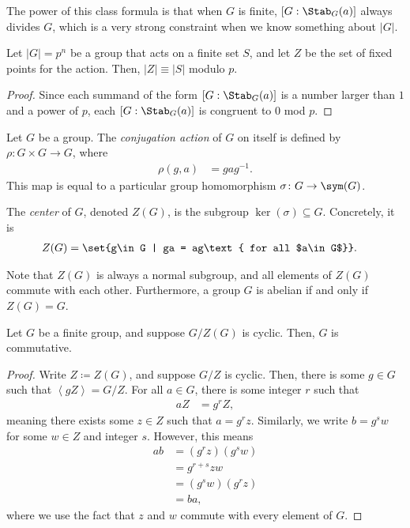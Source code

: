 \documentclass[10pt]{mypackage}
\begin{document}
The power of this class formula is that when $G$ is finite, $\left[ G:\Stab_G(a) \right]$ always divides $G$, which is a very strong constraint when we know something about $\left\vert G \right\vert$.
\begin{proposition}
  Let $\left\vert G \right\vert = p^{n}$ be a group that acts on a finite set $S$, and let $Z$ be the set of fixed points for the action. Then, $\left\vert Z \right\vert\equiv \left\vert S \right\vert$ modulo $p$.
\end{proposition}
\begin{proof}
  Since each summand of the form $\left[ G:\Stab_G(a) \right]$ is a number larger than $1$ and a power of $p$, each $\left[ G:\Stab_G(a) \right]$ is congruent to $0$ mod $p$.
\end{proof}
\begin{definition}
  Let $G$ be a group. The \textit{conjugation action} of $G$ on itself is defined by $\rho\colon G\times G \rightarrow G$, where
  \begin{align*}
    \rho\left( g,a \right) &= gag^{-1}.
  \end{align*}
  This map is equal to a particular group homomorphism $\sigma\colon G\rightarrow \sym(G)$.
\end{definition}
\begin{definition}[Center]
  The \textit{center} of $G$, denoted $Z(G)$, is the subgroup $\ker\left( \sigma \right)\subseteq G$. Concretely, it is
  \begin{align*}
    Z(G)&= \set{g\in G | ga = ag\text{ for all $a\in G$}}.
  \end{align*}
\end{definition}
Note that $Z(G)$ is always a normal subgroup, and all elements of $Z(G)$ commute with each other. Furthermore, a group $G$ is abelian if and only if $Z(G) = G$.
\begin{lemma}
  Let $G$ be a finite group, and suppose $G/Z(G)$ is cyclic. Then, $G$ is commutative.
\end{lemma}
\begin{proof}
  Write $Z\coloneq Z(G)$, and suppose $G/Z$ is cyclic. Then, there is some $g\in G$ such that $\left\langle gZ \right\rangle = G/Z$. For all $a\in G$, there is some integer $r$ such that
  \begin{align*}
    aZ &= g^{r}Z,
  \end{align*}
  meaning there exists some $z\in Z$ such that $a = g^{r}z$. Similarly, we write $b = g^{s}w$ for some $w\in Z$ and integer $s$. However, this means
  \begin{align*}
    ab &= \left( g^{r}z \right)\left( g^{s}w \right)\\
       &= g^{r+s}zw\\
       &= \left( g^{s}w \right)\left( g^{r}z \right)\\
       &= ba,
  \end{align*}
  where we use the fact that $z$ and $w$ commute with every element of $G$.
\end{proof}
\end{document}
